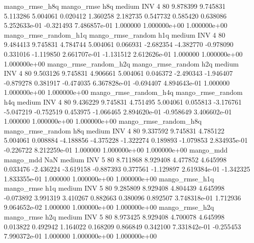        mango_rmse_h8q        mango_rmse                  h8q     medium      INV                 4 80  9.878399       9.745831 5.113286       5.004061    0.020412      1.360258      2.182735     0.547732       0.585420  0.638086 5.252633e-01    -0.321493   7.486857e-01            1.000000    1.000000e+00        1.000000e+00
mango_rmse_random_h1q mango_rmse_random                  h1q     medium      INV                 4 80  9.484413       9.745831 4.784744       5.004061    0.066931     -2.682354     -4.382770    -0.978090       0.331016 -1.119850 2.661707e-01    -1.131512   2.612626e-01            1.000000    1.000000e+00        1.000000e+00
mango_rmse_random_h2q mango_rmse_random                  h2q     medium      INV                 4 80  9.503126       9.745831 4.906661       5.004061    0.046372     -2.490343     -1.946407    -0.879278       0.381917 -0.474035 6.367828e-01    -0.694407   4.894643e-01            1.000000    1.000000e+00        1.000000e+00
mango_rmse_random_h4q mango_rmse_random                  h4q     medium      INV                 4 80  9.436229       9.745831 4.751495       5.004061    0.055813     -3.176761     -5.047219    -0.752519       0.453975 -1.066465 2.894620e-01    -0.958649   3.406602e-01            1.000000    1.000000e+00        1.000000e+00
mango_rmse_random_h8q mango_rmse_random                  h8q     medium      INV                 4 80  9.337592       9.745831 4.785122       5.004061    0.008884     -4.188856     -4.375228    -1.322274       0.189893 -1.079853 2.834935e-01    -0.226722   8.212259e-01            1.000000    1.000000e+00        1.000000e+00
            mango_mdd         mango_mdd                  NaN     medium      INV                 5 80  8.711868       8.929408 4.477852       4.645998    0.033476     -2.436224     -3.619158    -0.887393       0.377561 -1.129897 2.619384e-01    -1.342325   1.833355e-01            1.000000    1.000000e+00        1.000000e+00
       mango_rmse_h1q        mango_rmse                  h1q     medium      INV                 5 80  9.285809       8.929408 4.804439       4.645998   -0.073892      3.991319      3.410267     0.882663       0.380096  0.892507 3.748318e-01     1.712936   9.064652e-02            1.000000    1.000000e+00        1.000000e+00
       mango_rmse_h2q        mango_rmse                  h2q     medium      INV                 5 80  8.973425       8.929408 4.700078       4.645998    0.013822      0.492942      1.164022     0.168209       0.866849  0.342100 7.331842e-01    -0.255453   7.990372e-01            1.000000    1.000000e+00        1.000000e+00
